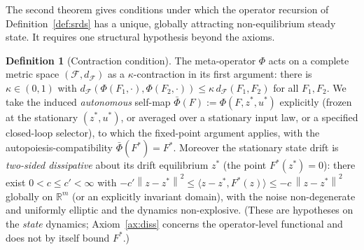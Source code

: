 \documentclass[11pt]{article}
\theoremstyle{plain}
\theoremstyle{definition}
\newtheorem{definition}[theorem]{Definition}
\theoremstyle{remark}
\newcommand{\R}{\mathbb{R}}
\newcommand{\norm}[1]{\left\lVert#1\right\rVert}
\begin{document}
The second theorem gives conditions under which the operator recursion of Definition~\ref{def:srds} has a unique, globally attracting non-equilibrium steady state. It requires one structural hypothesis beyond the axioms.

\begin{definition}[Contraction condition]\label{cond:contraction}
The meta-operator $\Phi$ acts on a complete metric space $(\mathcal F,d_{\mathcal F})$ as a $\kappa$-contraction in its first argument: there is $\kappa\in(0,1)$ with $d_{\mathcal F}(\Phi(F_1,\cdot),\Phi(F_2,\cdot))\le\kappa\,d_{\mathcal F}(F_1,F_2)$ for all $F_1,F_2$. We take the induced \emph{autonomous} self-map $\bar\Phi(F):=\Phi(F,z^*,u^*)$ explicitly (frozen at the stationary $(z^*,u^*)$, or averaged over a stationary input law, or a specified closed-loop selector), to which the fixed-point argument applies, with the autopoiesis-compatibility $\bar\Phi(F^*)=F^*$. Moreover the stationary state drift is \emph{two-sided dissipative} about its drift equilibrium $z^*$ (the point $F^*(z^*)=0$): there exist $0<c\le c'<\infty$ with $-c'\norm{z-z^*}^2\le\langle z-z^*,F^*(z)\rangle\le-c\,\norm{z-z^*}^2$ globally on $\R^m$ (or an explicitly invariant domain), with the noise non-degenerate and uniformly elliptic and the dynamics non-explosive. (These are hypotheses on the \emph{state} dynamics; Axiom~\ref{ax:diss} concerns the operator-level functional and does not by itself bound $F^*$.)
\end{definition}
\end{document}
